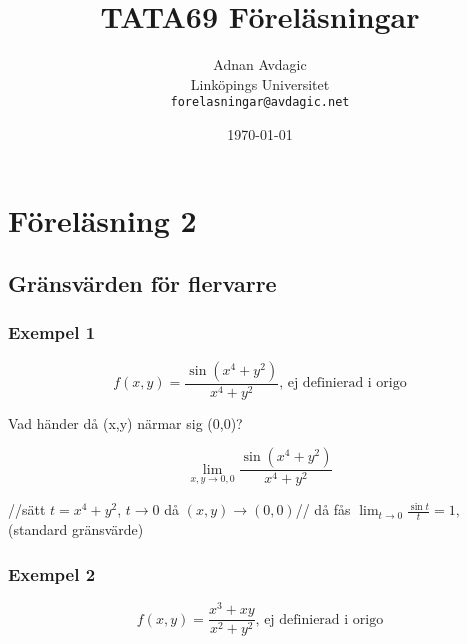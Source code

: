 \documentclass{article}
\title{TATA69 Föreläsningar}
\author{Adnan Avdagic\\
	Linköpings Universitet\\
	\texttt{forelasningar@avdagic.net}}
\date{\today}
\begin{document}
\hypersetup{pageanchor=false}
\begin{titlepage}
\maketitle
{}
\thispagestyle{empty}
\end{titlepage}

\hypersetup{pageanchor=true}
\thispagestyle{empty}
\tableofcontents
\thispagestyle{empty}





\newpage
\cleardoublepage
{}
\setcounter{page}{1}
\setcounter{section}{1}
\pagestyle{fancy}
\fancyhf{}
\rfoot{\rightmark}
\noindent
\section{Föreläsning 2}
\subsection{Gränsvärden för flervarre}

\subsubsection{Exempel 1} \flushleft
\begin{equation} \label{eq:2.1}
	f(x,y) = \frac{\sin(x^4+y^2)}{x^4+y^2} \text{, ej definierad i origo}
\end{equation}

Vad händer då (x,y) närmar sig (0,0)?

$$\lim_{x,y \rightarrow 0,0} \frac{\sin(x^4+y^2)}{x^4+y^2}$$

//sätt $t= \displaystyle x^4+y^2$, ${t \rightarrow 0}$ då ${(x,y) \rightarrow (0,0)}$// \newline
då fås \(\displaystyle \lim_{t \rightarrow 0} \frac{\sin t}{t} = 1,\) (standard gränsvärde) \newline

\subsubsection{Exempel 2} \flushleft
\begin{equation} \label{eq:2.2}
	f(x,y) = \frac{x^3+xy}{x^2+y^2} \text{, ej definierad i origo}
\end{equation}
\end{document}
